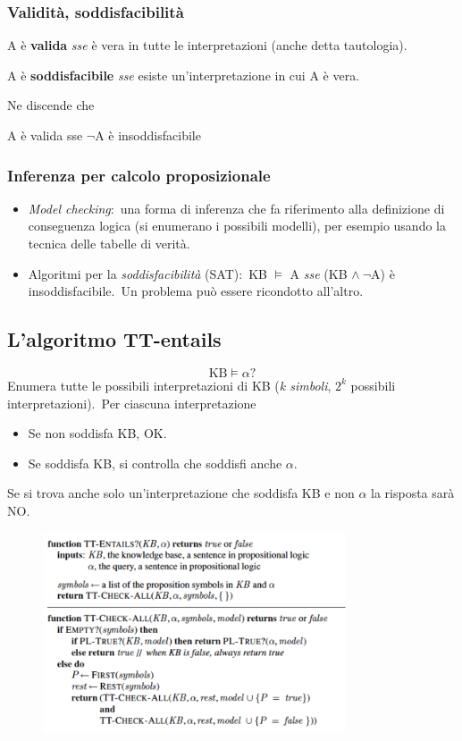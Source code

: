 \subsubsection{Validità, soddisfacibilità}

A è \textbf{valida} \textit{sse} è vera in tutte le interpretazioni (anche detta tautologia).

\noindent A è \textbf{soddisfacibile} \textit{sse} esiste un'interpretazione in cui A è vera.\

Ne discende che
\begin{center}
	A è valida sse $\lnot$A è insoddisfacibile
\end{center}

\subsubsection{Inferenza per calcolo proposizionale}

\begin{itemize}
	\item \textit{Model checking}:\ una forma di inferenza che fa riferimento alla definizione di conseguenza logica (si enumerano i possibili modelli), per esempio usando la tecnica delle tabelle di verità.\
	\item Algoritmi per la \textit{soddisfacibilità} (SAT):\ KB $\models$ A \textit{sse} (KB $\land\ \lnot$A) è insoddisfacibile.\ Un problema può essere ricondotto all'altro.
\end{itemize}

\subsection{L'algoritmo TT-entails}
\[\mathrm{KB} \models\alpha?\]
Enumera tutte le possibili interpretazioni di KB (\textit{k simboli}, $2^k$ possibili interpretazioni).\
Per ciascuna interpretazione
\begin{itemize}
	\item Se non soddisfa KB, OK.
	\item Se soddisfa KB, si controlla che soddisfi anche $\alpha$.
\end{itemize}
Se si trova anche solo un'interpretazione che soddisfa KB e non $\alpha$ la risposta sarà NO.

\begin{figure}[H]
	\centering
	\includegraphics[width=0.8\textwidth]{immagini/TTEntails.png}
\end{figure}

